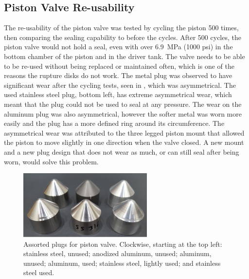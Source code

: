 \subsection{Piston Valve Re-usability} \label{ss:reusability}
The re-usability of the piston valve was tested by cycling the piston 500 times, then comparing the sealing capability to before the cycles. After 500 cycles, the piston valve would not hold a seal, even with over \SI{6.9}{\mega\pascal} (1000 psi) in the bottom chamber of the piston and in the driver tank. The valve needs to be able to be re-used without being replaced or maintained often, which is one of the reasons the rupture disks do not work. The metal plug was observed to have significant wear after the cycling tests, seen in , which was asymmetrical. The used stainless steel plug, bottom left, has extreme asymmetrical wear, which meant that the plug could not be used to seal at any pressure. The wear on the aluminum plug was also asymmetrical, however the softer metal was worn more easily and the plug has a more defined ring around its circumference. The asymmetrical wear was attributed to the three legged piston mount that allowed the piston to move slightly in one direction when the valve closed. A new mount and a new plug design that does not wear as much, or can still seal after being worn, would solve this problem.

\begin{figure}[htbp]
    \vspace{16pt}
    \centering
    \includegraphics[width=0.6\textwidth]{design/photos/plug_gen1_wear.png}
    \caption{Assorted plugs for piston valve. Clockwise, starting at the top left: stainless steel, unused; anodized aluminum, unused; aluminum, unused; aluminum, used; stainless steel, lightly used; and stainless steel used.}
    \label{fig:plug wear}
    \vspace{16pt}
\end{figure}

